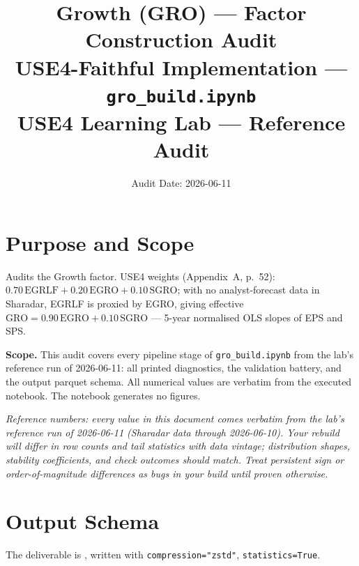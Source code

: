 \documentclass[11pt,a4paper]{article}
\title{\textbf{Growth (GRO) --- Factor Construction Audit}\\[2pt]
\large USE4-Faithful Implementation --- \texttt{gro\_build.ipynb}\\[4pt]
\normalsize USE4 Learning Lab --- Reference Audit}
\author{Audit Date: 2026-06-11}
\date{}
\newcommand{\NOTE}[1]{\textcolor{note}{\textit{#1}}}
\begin{document}
\maketitle
\tableofcontents
\newpage

\section{Purpose and Scope}

Audits the Growth factor. USE4 weights (Appendix~A, p.~52):
$0.70\,\mathrm{EGRLF} + 0.20\,\mathrm{EGRO} + 0.10\,\mathrm{SGRO}$; with no
analyst-forecast data in Sharadar, EGRLF is proxied by EGRO, giving effective
$\mathrm{GRO} = 0.90\,\mathrm{EGRO} + 0.10\,\mathrm{SGRO}$ --- 5-year normalised
OLS slopes of EPS and SPS.

\smallskip
\textbf{Scope.} This audit covers every pipeline stage of
\texttt{gro\_build.ipynb} from the lab's reference run of 2026-06-11: all printed diagnostics, the
validation battery, and the output parquet schema. All numerical values are
verbatim from the executed notebook. The notebook generates no figures.

\NOTE{Reference numbers: every value in this document comes verbatim from the lab's reference run of 2026-06-11 (Sharadar data through 2026-06-10). Your rebuild will differ in row counts and tail statistics with data vintage; distribution shapes, stability coefficients, and check outcomes should match. Treat persistent sign or order-of-magnitude differences as bugs in your build until proven otherwise.}


\section{Output Schema}

The deliverable is , written with
\texttt{compression="zstd"}, \newline\texttt{statistics=True}.
\end{document}
